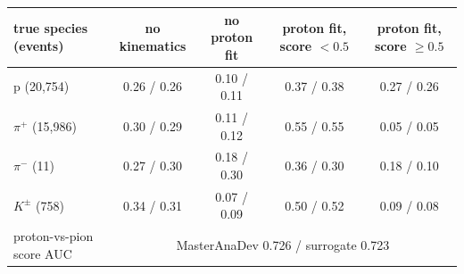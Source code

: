 \begin{tabular}{lcccc}
\toprule
true species (events) & no kinematics & no proton fit & proton fit, score $<0.5$ & proton fit, score $\geq 0.5$ \\
\midrule
p (20,754) & 0.26 / 0.26 & 0.10 / 0.11 & 0.37 / 0.38 & 0.27 / 0.26 \\
$\pi^+$ (15,986) & 0.30 / 0.29 & 0.11 / 0.12 & 0.55 / 0.55 & 0.05 / 0.05 \\
$\pi^-$ (11) & 0.27 / 0.30 & 0.18 / 0.30 & 0.36 / 0.30 & 0.18 / 0.10 \\
$K^\pm$ (758) & 0.34 / 0.31 & 0.07 / 0.09 & 0.50 / 0.52 & 0.09 / 0.08 \\
\midrule
proton-vs-pion score AUC & \multicolumn{4}{c}{MasterAnaDev 0.726 / surrogate 0.723} \\
\bottomrule
\end{tabular}
